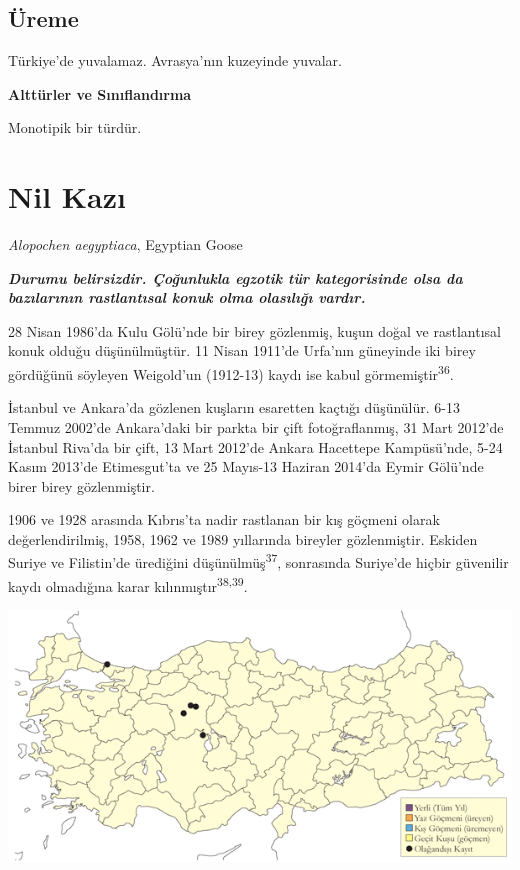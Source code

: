 \documentclass[
  letterpaper,
  DIV=11,
  numbers=noendperiod]{scrreprt}
\begin{document}
\hypertarget{uxfcreme-9}{%
\subsection{\texorpdfstring{\textbf{Üreme}}{Üreme}}\label{uxfcreme-9}}

Türkiye'de yuvalamaz. Avrasya'nın kuzeyinde yuvalar.

\textbf{Alttürler ve Sınıflandırma}

Monotipik bir türdür.

\hypertarget{nil-kazux131}{%
\section{Nil Kazı}\label{nil-kazux131}}

\emph{Alopochen aegyptiaca}, Egyptian Goose

\textbf{\emph{Durumu belirsizdir. Çoğunlukla egzotik tür kategorisinde
olsa da bazılarının rastlantısal konuk olma olasılığı vardır.}}

28 Nisan 1986'da Kulu Gölü'nde bir birey gözlenmiş, kuşun doğal ve
rastlantısal konuk olduğu düşünülmüştür. 11 Nisan 1911'de Urfa'nın
güneyinde iki birey gördüğünü söyleyen Weigold'un (1912-13) kaydı ise
kabul görmemiştir\textsuperscript{36}.

İstanbul ve Ankara'da gözlenen kuşların esaretten kaçtığı düşünülür.
6-13 Temmuz 2002'de Ankara'daki bir parkta bir çift fotoğraflanmış, 31
Mart 2012'de İstanbul Riva'da bir çift, 13 Mart 2012'de Ankara Hacettepe
Kampüsü'nde, 5-24 Kasım 2013'de Etimesgut'ta ve 25 Mayıs-13 Haziran
2014'da Eymir Gölü'nde birer birey gözlenmiştir.

1906 ve 1928 arasında Kıbrıs'ta nadir rastlanan bir kış göçmeni olarak
değerlendirilmiş, 1958, 1962 ve 1989 yıllarında bireyler gözlenmiştir.
Eskiden Suriye ve Filistin'de ürediğini düşünülmüş\textsuperscript{37},
sonrasında Suriye'de hiçbir güvenilir kaydı olmadığına karar
kılınmıştır\textsuperscript{38,39}.

\includegraphics{images/harita_Page_011.png}
\end{document}
